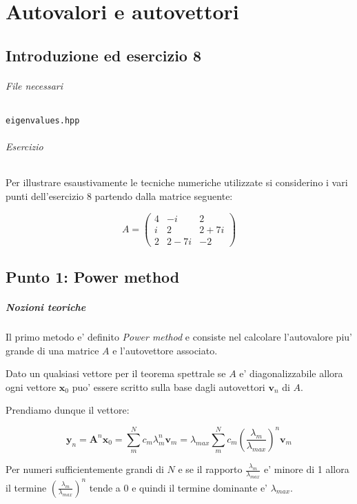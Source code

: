 \setchapterpreamble[u]{\margintoc}
\chapter{Autovalori e autovettori}

\section{Introduzione ed esercizio 8}

\subparagraph{File necessari} \texttt{eigenvalues.hpp}

\subparagraph{Esercizio}

Per illustrare esaustivamente le tecniche numeriche utilizzate si considerino i
vari punti dell'esercizio 8 partendo dalla matrice seguente:

\[ A = \begin{pmatrix}
		4 & -i   & 2    \\
		i & 2    & 2+7i \\
		2 & 2-7i & -2
	\end{pmatrix} \]

\section{Punto 1: Power method}

\paragraph{Nozioni teoriche}

Il primo metodo e' definito \textit{Power method} e consiste nel calcolare l'autovalore piu' grande di una matrice $A$ e l'autovettore associato.

Dato un qualsiasi vettore per il teorema spettrale se $A$ e' diagonalizzabile allora ogni vettore $\mathbf{x}_0$ puo' essere scritto sulla base dagli autovettori $\mathbf{v}_n$ di $A$.

Prendiamo dunque il vettore:

\[ \mathbf{y}_n = \mathbf{A}^n \mathbf{x}_0 = \sum_m^N c_m \lambda_m^n \mathbf{v}_m= \lambda_{max} \sum_m^N c_m \left( \frac{\lambda_m}{\lambda_{max}} \right)^n \mathbf{v}_m\]

Per numeri sufficientemente grandi di $N$ e se il rapporto $\frac{\lambda_m}{\lambda_{max}}$ e' minore di 1 allora il termine $\left( \frac{\lambda_m}{\lambda_{max}} \right)^n$ tende a 0 e quindi il termine dominante e' $\lambda_{max}$.

